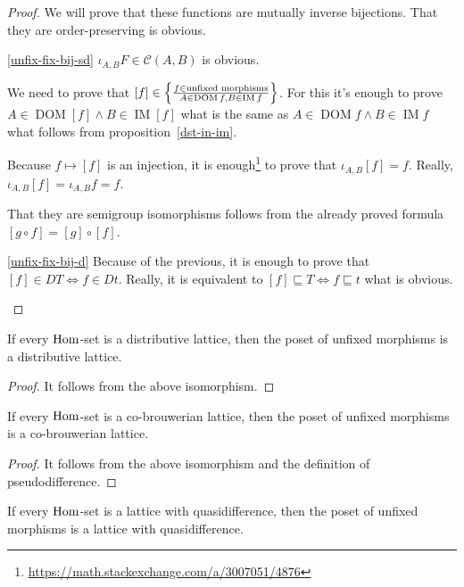 \begin{proof}
We will prove that these functions are mutually inverse
bijections. That they are order-preserving is obvious.
\begin{widedisorder}
\item[\ref{unfix-fix-bij-sd}]
$\iota_{A,B}F\in\mathcal{C}(A,B)$ is obvious.

We need to prove that
$[f]\in\left\{ \frac{f\in\text{unfixed morphisms}}{A\in\operatorname{DOM}f,B\in\operatorname{IM}f}\right\}$.
For this it's enough to prove
$A\in\operatorname{DOM}[f]\land B\in\operatorname{IM}[f]$
what is the same as
$A\in\operatorname{DOM}f\land B\in\operatorname{IM}f$
what follows from proposition~\ref{dst-in-im}.

Because $f\mapsto[f]$ is an injection, it is
enough\footnote{\url{https://math.stackexchange.com/a/3007051/4876}}
to prove that 
$\iota_{A,B}[f]=f$. Really, $\iota_{A,B}[f]=\iota_{A,B}f=f$.

That they are semigroup isomorphisms follows from the
already proved formula $[g\circ f]=[g]\circ[f]$.

\item[\ref{unfix-fix-bij-d}]
Because of the previous, it is enough to prove that
$[f]\in DT\Leftrightarrow f\in Dt$. Really, it is equivalent
to $[f]\sqsubseteq T\Leftrightarrow f\sqsubseteq t$
what is obvious.
\end{widedisorder}
\end{proof}

\begin{prop}
If every $\operatorname{Hom}$-set is a distributive lattice, then
the poset of unfixed morphisms is a distributive lattice.
\end{prop}

\begin{proof}
It follows from the above isomorphism.
\end{proof}

\begin{prop}
If every $\operatorname{Hom}$-set is a co-brouwerian lattice, then
the poset of unfixed morphisms is a co-brouwerian lattice.
\end{prop}

\begin{proof}
It follows from the above isomorphism and the definition
of pseudodifference.
\end{proof}

\begin{prop}
If every $\operatorname{Hom}$-set is a lattice with quasidifference, then
the poset of unfixed morphisms is a lattice with
quasidifference.
\end{prop}

